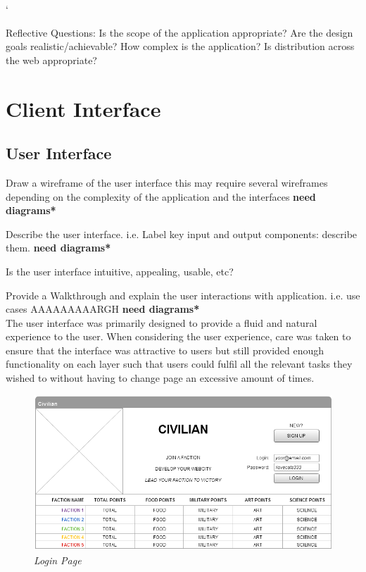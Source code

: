 `\documentclass{sig-alt-release2}
\begin{document}
Reflective Questions: 
Is the scope of the application appropriate? 
Are the design goals realistic/achievable? 
How complex is the application? 
Is distribution across the web appropriate? 

\section{Client Interface}

\subsection{User Interface}

Draw a wireframe of the user interface 
this may require several wireframes depending on the complexity of the application and the interfaces {\bf *need diagrams*} 

Describe the user interface.
i.e. Label key input and output components: describe them. {\bf *need diagrams*} 

Is the user interface intuitive, appealing, usable, etc?

Provide a Walkthrough and explain the user interactions with application. 
i.e. use cases AAAAAAAAARGH {\bf *need diagrams*} \\

The user interface was primarily designed to provide a fluid and natural experience to the user. When considering the user experience, care was taken to ensure that the interface was attractive to users but still provided enough functionality on each layer such that users could fulfil all the relevant tasks they wished to without having to change page an excessive amount of times. \\

\begin{figure}[!htbp]
  \caption{\textit{Login Page}}
  \begin{center}
		\includegraphics[scale=0.25]{img/w3.png}
  \end{center}
\end{figure}
\end{document}
